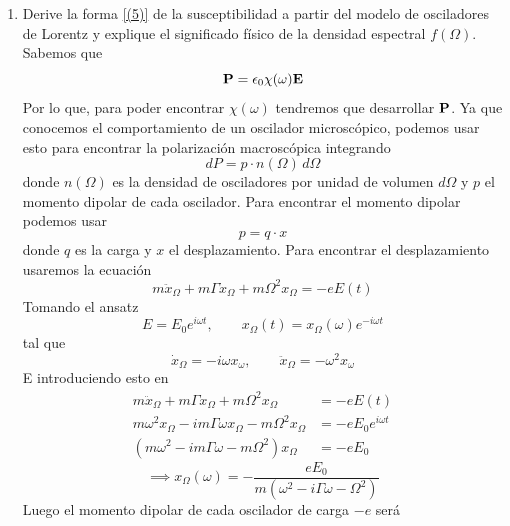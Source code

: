 \documentclass[]{article}
\numberwithin{equation}{section}
\begin{document}
\begin{enumerate}
\begin{enumerate}
		\item[1.] Derive la forma \ref{(5)} de la susceptibilidad a partir del modelo de osciladores de Lorentz y explique el significado físico de la densidad espectral $f (\Omega)$.
		\resp Sabemos que
		\begin{equation}
			\mathbf{P} = \epsilon_{0} \chi(\omega) \mathbf{E}
		\end{equation}
		Por lo que, para poder encontrar $\chi(\omega)$ tendremos que desarrollar $\mathbf{P}$. Ya que conocemos el comportamiento de un oscilador microscópico, podemos usar esto para encontrar la polarización macroscópica integrando
		\begin{equation}
			dP = p \cdot n(\Omega) \, d\Omega
		\end{equation}
		donde $n(\Omega)$ es la densidad de osciladores por unidad de volumen $d\Omega$ y $p$ el momento dipolar de cada oscilador. Para encontrar el momento dipolar podemos usar
		\begin{equation}
			p = q \cdot x
		\end{equation}
		donde $q$ es la carga y $x$ el desplazamiento. Para encontrar el desplazamiento usaremos la ecuación
		\begin{equation*}
			m \ddot{x}_\Omega + m \Gamma \dot{x}_\Omega + m\Omega^2 x_\Omega = - e E(t)
		\end{equation*}
		Tomando el ansatz
		\begin{equation*}
			E = E_0 e^{i \omega t}, \qquad x_\Omega (t) = x_\Omega(\omega) e^{-i \omega t}
		\end{equation*}
		tal que
		\begin{equation*}
			\dot{x}_\Omega = -i\omega x_\omega, \qquad \ddot{x}_\Omega = - \omega^2 x_\omega
		\end{equation*}
		E introduciendo esto en
		\begin{align*}
			m \ddot{x}_\Omega + m \Gamma \dot{x}_\Omega + m\Omega^2 x_\Omega &= - e E(t)\\
			m \omega^2 x_\Omega - i m \Gamma \omega x_\Omega - m\Omega^2 x_\Omega &= - e E_0 e^{i \omega t}\\
			\left(m \omega^2 - i m \Gamma \omega - m\Omega^2 \right) x_\Omega &= - e E_0
		\end{align*}
		\begin{equation*}
			\implies x_\Omega(\omega) = - \frac{e E_0}{m \left(\omega^2 - i \Gamma \omega - \Omega^2\right)}
		\end{equation*}
		Luego el momento dipolar de cada oscilador de carga $-e$ será
		\begin{equation*}

\end{equation*}
\end{enumerate}
\end{enumerate}
\end{document}
